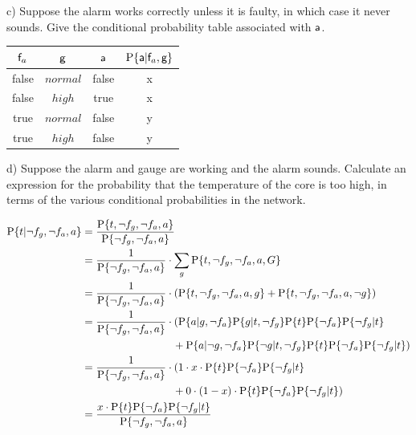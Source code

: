 \documentclass[a4paper,footsepline]{scrartcl}
\begin{document}
c) Suppose the alarm works correctly unless it is faulty, in which case it
  never sounds. Give the conditional probability table associated with
  $\rv{a}$.
  
  	\vspace{0.5cm}
  	\begin{tabular}{|c|c|c|c|}\hline
		$\rv{f}_a$ & $\rv{g}$   &  $\rv{a}$ & $\prob{\rv{a}|\rv{f}_a,\rv{g}}$ \\\hline
		false      & $normal$   &  false    & x \\\hline
		false      & $high$     &  true     & x \\\hline
		true       & $normal$   &  false    & y \\\hline
		true       & $high$     &  false    & y \\\hline
	\end{tabular}
	\vspace{0.5cm}

d) Suppose the alarm and gauge are working and the alarm sounds. Calculate
  an expression for the probability that the temperature of the core is too
  high, in terms of the various conditional probabilities in the network.

	\begin{align*} 
	\prob{t|\neg f_g, \neg f_a, a} &= \frac{\prob{t,\neg f_g, \neg f_a, a}}{\prob{\neg f_g, \neg f_a, a}} \\
	&= \frac{1}{\prob{\neg f_g, \neg f_a, a}} \cdot \sum_g \prob{t,\neg f_g, \neg f_a, a, G} \\
	&= \frac{1}{\prob{\neg f_g, \neg f_a, a}} \cdot \left( \prob{t,\neg f_g, \neg f_a, a, g} + \prob{t,\neg f_g, \neg f_a, a, \neg g} \right) \\
	&= \frac{1}{\prob{\neg f_g, \neg f_a, a}} \cdot ( \prob{a | g, \neg f_a} \prob{g|t, \neg f_g} \prob{t} \prob{\neg f_a} \prob{\neg f_g | t}  \\
                                             & \hspace{3cm} + \prob{a | \neg g, \neg f_a} \prob{\neg g|t, \neg f_g} \prob{t} \prob{\neg f_a} \prob{\neg f_g | t} ) \\
	&= \frac{1}{\prob{\neg f_g, \neg f_a, a}} \cdot ( 1 \cdot x \cdot \prob{t} \prob{\neg f_a} \prob{\neg f_g | t}  \\
                                             & \hspace{3cm} + 0 \cdot (1-x) \cdot \prob{t} \prob{\neg f_a} \prob{\neg f_g | t} ) \\
	&= \frac{x \cdot \prob{t} \prob{\neg f_a} \prob{\neg f_g | t}}{\prob{\neg f_g, \neg f_a, a}} \\
	\end{align*}
	
\end{document}
